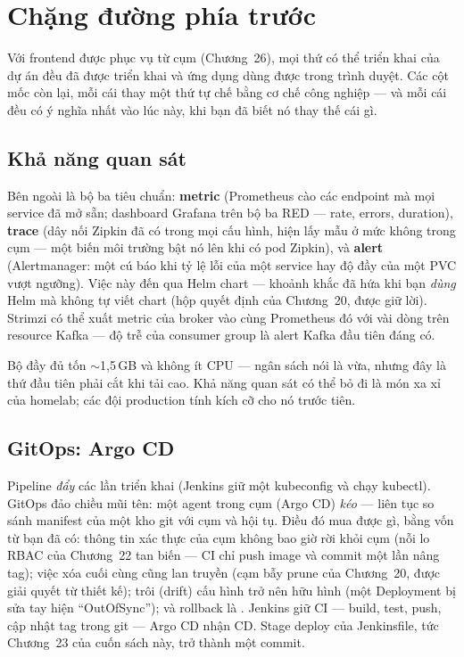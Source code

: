 \chapter{Chặng đường phía trước}
\label{ch:roadahead}

Với frontend được phục vụ từ cụm (Chương~26), mọi thứ có thể triển
khai của dự án đều đã được triển khai và ứng dụng dùng được trong
trình duyệt. Các cột mốc còn lại, mỗi cái thay một thứ tự chế bằng cơ
chế công nghiệp --- và mỗi cái đều có ý nghĩa nhất vào lúc này, khi
bạn đã biết nó thay thế cái gì.

\section{Khả năng quan sát}

Bên ngoài  là bộ ba tiêu chuẩn: \textbf{metric}
(Prometheus cào các endpoint  mà mọi
service đã mở sẵn; dashboard Grafana trên bộ ba RED --- rate, errors,
duration), \textbf{trace} (dây nối Zipkin đã có trong mọi cấu hình,
hiện lấy mẫu ở mức không trong cụm --- một biến môi trường bật nó lên
khi có pod Zipkin), và \textbf{alert} (Alertmanager: một cú báo khi tỷ
lệ lỗi của một service hay độ đầy của một PVC vượt ngưỡng). Việc này
đến qua Helm chart  --- khoảnh khắc đã hứa
khi bạn \emph{dùng} Helm mà không tự viết chart (hộp quyết định của
Chương~20, được giữ lời). Strimzi có thể xuất metric của broker vào
cùng Prometheus đó với vài dòng  trên resource
Kafka --- độ trễ của consumer group là alert Kafka đầu tiên đáng có.

\begin{hardware}
Bộ đầy đủ tốn $\sim$1,5\,GB và không ít CPU --- ngân sách nói là vừa,
nhưng đây là thứ đầu tiên phải cắt khi tải cao. Khả năng quan sát có
thể bỏ đi là món xa xỉ của homelab; các đội production tính kích cỡ
cho nó trước tiên.
\end{hardware}

\section{GitOps: Argo CD}

Pipeline \emph{đẩy} các lần triển khai (Jenkins giữ một kubeconfig và
chạy kubectl). GitOps đảo chiều mũi tên: một agent trong cụm (Argo CD)
\emph{kéo} --- liên tục so sánh manifest của một kho git với cụm và
hội tụ. Điều đó mua được gì, bằng vốn từ bạn đã có: thông tin xác
thực của cụm không bao giờ rời khỏi cụm (nỗi lo RBAC của Chương~22
tan biến --- CI chỉ push image và commit một lần nâng tag); việc xóa
cuối cùng cũng lan truyền (cạm bẫy prune của Chương~20, được giải
quyết từ thiết kế); trôi (drift) cấu hình trở nên hữu hình (một
Deployment bị sửa tay hiện ``OutOfSync''); và rollback là . Jenkins giữ CI --- build, test, push, cập nhật tag trong git
--- Argo CD nhận CD. Stage deploy của Jenkinsfile, tức Chương~23 của
cuốn sách này, trở thành một commit.

